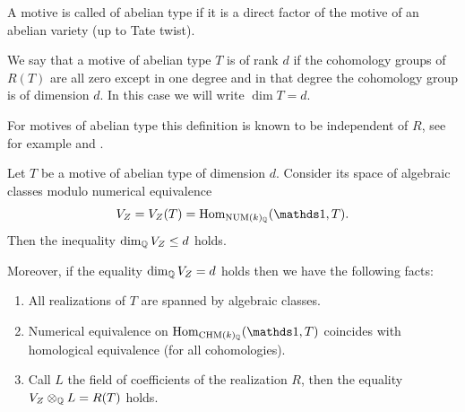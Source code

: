 \documentclass[11pt]{amsart}
\begin{document}
\begin{definition}\label{defrank}
 A motive is called of abelian type if it  is a  direct factor of the motive of an abelian variety (up to Tate twist).
 
 
We say that a motive of abelian type $T$ is  of rank $d$  if the  cohomology groups of $R(T)$ are all zero except in one degree and in that degree the cohomology group is of dimension $d$.  In this case we will write $\dim T = d.$
\end{definition}

\begin{remark}\label{remarkrank}
For motives of abelian type this definition is known to be independent of $R$, see for example  \cite[Corollary 3.5]{jannsen} and \cite[Corollary 1.6]{Ascona}.
\end{remark}
\begin{prop}\label{motivisupersingolari} 
Let $T$ be a motive of abelian type of dimension $d$. 
Consider   its space of algebraic classes modulo numerical equivalence \[V_Z = V_Z(T) =  \Hom_{\NUM(k)_\Q}(\one, T).\] Then the  inequality 
$\dim_{\mathbb{Q}} V_Z \leq d$ holds.

Moreover, if the equality $\dim_{\mathbb{Q}} V_Z = d$ holds then we have the following facts:

\begin{enumerate}
\item All  realizations of $T$ are spanned by algebraic classes.
\item Numerical equivalence on $\Hom_{\CHM(k)_\Q}(\one,T)$ coincides with  homological equivalence (for all  cohomologies).
\item Call $L$ the field of coefficients of the realization $R$, then the equality $V_Z\otimes _{\mathbb{Q}} L = R(T)$ holds.
\end{enumerate}
\end{prop}
\end{document}
